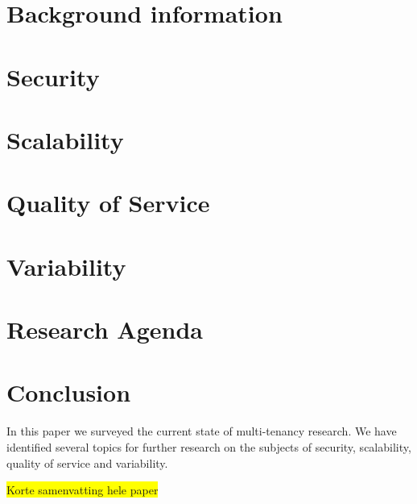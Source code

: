 \documentclass{article}
\newcommand{\highlight}[1]{\colorbox{yellow}{#1}}
\begin{document}
\section{Background information}
\label{sec:bg}


\section{Security}
\label{sec:security}


\section{Scalability}
\label{sec:scalability}


\section{Quality of Service}
\label{sec:qos}


\section{Variability}
\label{sec:variability}


\section{Research Agenda}
\label{sec:ra}


\section{Conclusion}
\label{sec:conclusion}
In this paper we surveyed the current state of multi-tenancy research.
We have identified several topics for further research on the subjects of security, scalability, quality of service and variability.

\highlight{Korte samenvatting hele paper}\\
\end{document}
